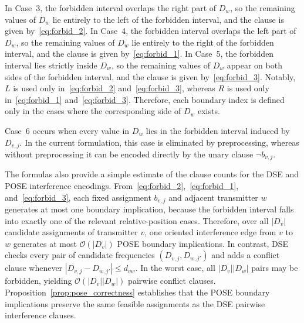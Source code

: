 \documentclass[letterpaper,journal]{IEEEtran}
\begin{document}
In Case~3, the forbidden interval overlaps the right part of $D_w$, so the remaining values of $D_w$ lie entirely to the left of the forbidden interval, and the clause is given by~\eqref{eq:forbid_2}. In Case~4, the forbidden interval overlaps the left part of $D_w$, so the remaining values of $D_w$ lie entirely to the right of the forbidden interval, and the clause is given by~\eqref{eq:forbid_1}. In Case~5, the forbidden interval lies strictly inside $D_w$, so the remaining values of $D_w$ appear on both sides of the forbidden interval, and the clause is given by~\eqref{eq:forbid_3}. Notably, $L$ is used only in~\eqref{eq:forbid_2} and~\eqref{eq:forbid_3}, whereas $R$ is used only in~\eqref{eq:forbid_1} and~\eqref{eq:forbid_3}. Therefore, each boundary index is defined only in the cases where the corresponding side of $D_w$ exists.

Case~6 occurs when every value in $D_w$ lies in the forbidden interval induced by $D_{v,j}$. In the current formulation, this case is eliminated by preprocessing, whereas without preprocessing it can be encoded directly by the unary clause $\neg b_{v,j}$. 

The formulas also provide a simple estimate of the clause counts for the DSE and POSE interference encodings. From~\eqref{eq:forbid_2},~\eqref{eq:forbid_1}, and~\eqref{eq:forbid_3}, each fixed assignment $b_{v,j}$ and adjacent transmitter $w$ generates at most one boundary implication, because the forbidden interval falls into exactly one of the relevant relative-position cases. Therefore, over all $|D_v|$ candidate assignments of transmitter $v$, one oriented interference edge from $v$ to $w$ generates at most $\mathcal{O}(|D_v|)$ POSE boundary implications. In contrast, DSE checks every pair of candidate frequencies $(D_{v,j},D_{w,j'})$ and adds a conflict clause whenever $|D_{v,j}-D_{w,j'}|\le d_{vw}$. In the worst case, all $|D_v||D_w|$ pairs may be forbidden, yielding $\mathcal{O}(|D_v||D_w|)$ pairwise conflict clauses. Proposition~\ref{prop:pose_correctness} establishes that the POSE boundary implications preserve the same feasible assignments as the DSE pairwise interference clauses.
\end{document}
